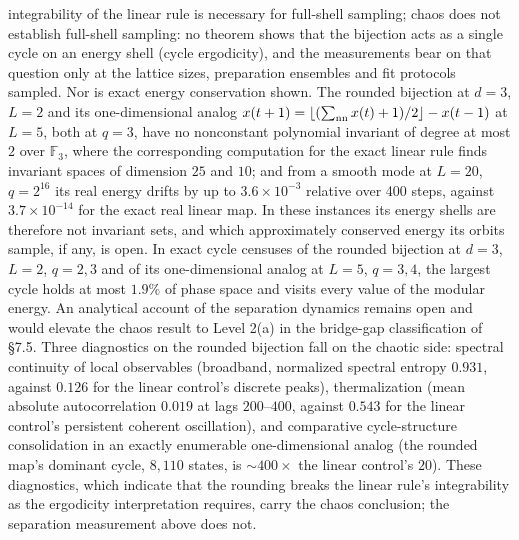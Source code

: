 \documentclass[
]{article}
\begin{document}
integrability of the linear rule is necessary for full-shell sampling;
chaos does not establish full-shell sampling: no theorem shows that the
bijection acts as a single cycle on an energy shell (cycle ergodicity),
and the measurements bear on that question only at the lattice sizes,
preparation ensembles and fit protocols sampled. Nor is exact energy
conservation shown. The rounded bijection at \(d=3\), \(L=2\) and its
one-dimensional analog
\(x(t+1)=\lfloor(\sum_{\rm nn}x(t)+1)/2\rfloor-x(t-1)\) at \(L=5\), both
at \(q=3\), have no nonconstant polynomial invariant of degree at most
\(2\) over \(\mathbb{F}_3\), where the corresponding computation for the
exact linear rule finds invariant spaces of dimension \(25\) and \(10\);
and from a smooth mode at \(L=20\), \(q=2^{16}\) its real energy drifts
by up to \(3.6\times10^{-3}\) relative over 400 steps, against
\(3.7\times10^{-14}\) for the exact real linear map. In these instances
its energy shells are therefore not invariant sets, and which
approximately conserved energy its orbits sample, if any, is open. In
exact cycle censuses of the rounded bijection at \(d=3\), \(L=2\),
\(q=2,3\) and of its one-dimensional analog at \(L=5\), \(q=3,4\), the
largest cycle holds at most \(1.9\%\) of phase space and visits every
value of the modular energy. An analytical account of the separation
dynamics remains open and would elevate the chaos result to Level 2(a)
in the bridge-gap classification of §7.5. Three diagnostics on the
rounded bijection fall on the chaotic side: spectral continuity of local
observables (broadband, normalized spectral entropy \(0.931\), against
\(0.126\) for the linear control's discrete peaks), thermalization (mean
absolute autocorrelation \(0.019\) at lags \(200\)--\(400\), against
\(0.543\) for the linear control's persistent coherent oscillation), and
comparative cycle-structure consolidation in an exactly enumerable
one-dimensional analog (the rounded map's dominant cycle, \(8{,}110\)
states, is \(\sim 400\times\) the linear control's \(20\)). These
diagnostics, which indicate that the rounding breaks the linear rule's
integrability as the ergodicity interpretation requires, carry the chaos
conclusion; the separation measurement above does not.
\end{document}
